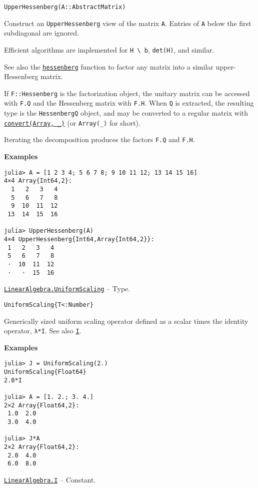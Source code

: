 \begin{adjustwidth}{2em}{0pt}


\begin{verbatim}
UpperHessenberg(A::AbstractMatrix)
\end{verbatim}

Construct an \texttt{UpperHessenberg} view of the matrix \texttt{A}. Entries of \texttt{A} below the first subdiagonal are ignored.

Efficient algorithms are implemented for \texttt{H {\textbackslash} b}, \texttt{det(H)}, and similar.

See also the \hyperlink{14451165250498024497}{\texttt{hessenberg}} function to factor any matrix into a similar upper-Hessenberg matrix.

If \texttt{F::Hessenberg} is the factorization object, the unitary matrix can be accessed with \texttt{F.Q} and the Hessenberg matrix with \texttt{F.H}. When \texttt{Q} is extracted, the resulting type is the \texttt{HessenbergQ} object, and may be converted to a regular matrix with \hyperlink{1846942650946171605}{\texttt{convert(Array, \_)}} (or \texttt{Array(\_)} for short).

Iterating the decomposition produces the factors \texttt{F.Q} and \texttt{F.H}.

\textbf{Examples}


\begin{verbatim}
julia> A = [1 2 3 4; 5 6 7 8; 9 10 11 12; 13 14 15 16]
4×4 Array{Int64,2}:
  1   2   3   4
  5   6   7   8
  9  10  11  12
 13  14  15  16

julia> UpperHessenberg(A)
4×4 UpperHessenberg{Int64,Array{Int64,2}}:
 1   2   3   4
 5   6   7   8
 ⋅  10  11  12
 ⋅   ⋅  15  16
\end{verbatim}



\end{adjustwidth}
\hypertarget{723087258311673942}{} 
\hyperlink{723087258311673942}{\texttt{LinearAlgebra.UniformScaling}}  -- {Type.}

\begin{adjustwidth}{2em}{0pt}


\begin{verbatim}
UniformScaling{T<:Number}
\end{verbatim}

Generically sized uniform scaling operator defined as a scalar times the identity operator, \texttt{λ*I}. See also \hyperlink{15346645596018210602}{\texttt{I}}.

\textbf{Examples}


\begin{verbatim}
julia> J = UniformScaling(2.)
UniformScaling{Float64}
2.0*I

julia> A = [1. 2.; 3. 4.]
2×2 Array{Float64,2}:
 1.0  2.0
 3.0  4.0

julia> J*A
2×2 Array{Float64,2}:
 2.0  4.0
 6.0  8.0
\end{verbatim}



\end{adjustwidth}
\hypertarget{15346645596018210602}{} 
\hyperlink{15346645596018210602}{\texttt{LinearAlgebra.I}}  -- {Constant.}

